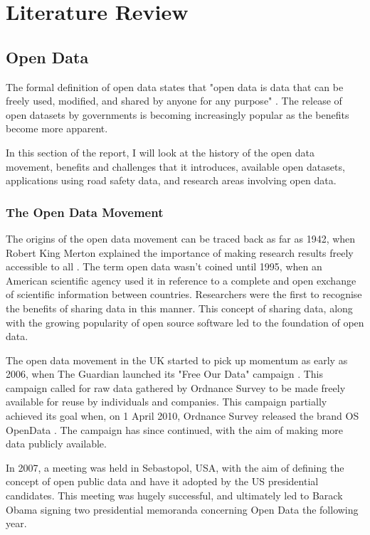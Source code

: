 \documentclass[authoryearcitations]{UoYCSproject}
\begin{document}
\chapter{Literature Review}

\section{Open Data}

The formal definition of open data states that "open data is data that can be freely used, modified, and shared by anyone for any purpose" \citep{OpenKnowledge}. The release of open datasets by governments is becoming increasingly popular as the benefits become more apparent.

In this section of the report, I will look at the history of the open data movement, benefits and challenges that it introduces, available open datasets, applications using road safety data, and research areas involving open data.

\subsection{The Open Data Movement}

The origins of the open data movement can be traced back as far as 1942, when Robert King Merton explained the importance of making research results freely accessible to all \citep{Chignard2013}. The term open data wasn't coined until 1995, when an American scientific agency used it in reference to a complete and open exchange of scientific information between countries. Researchers were the first to recognise the benefits of sharing data in this manner. This concept of sharing data, along with the growing popularity of open source software led to the foundation of open data.

The open data movement in the UK started to pick up momentum as early as 2006, when The Guardian launched its "Free Our Data" campaign \citep{GuardianTechnology2006}. This campaign called for raw data gathered by Ordnance Survey to be made freely available for reuse by individuals and companies. This campaign partially achieved its goal when, on 1 April 2010, Ordnance Survey released the brand OS OpenData \citep{OrdnanceSurveyteam2010}. The campaign has since continued, with the aim of making more data publicly available. 

In 2007, a meeting was held in Sebastopol, USA, with the aim of defining the concept of open public data and have it adopted by the US presidential candidates. This meeting was hugely successful, and ultimately led to Barack Obama signing two presidential memoranda concerning Open Data the following year. 
\end{document}
